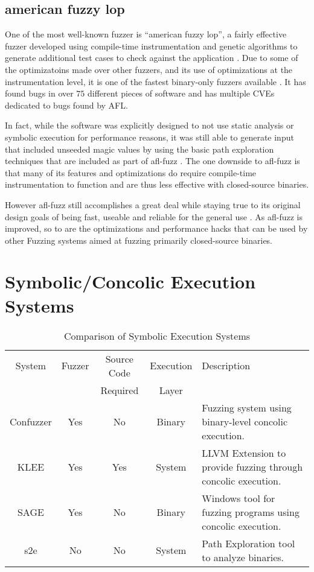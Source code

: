 \subsection{american fuzzy lop}
One of the most well-known fuzzer is ``american fuzzy lop'', a fairly effective
fuzzer developed using compile-time instrumentation and genetic algorithms to
generate additional test cases to check against the application \cite{afl}. Due
to some of the optimizatoins made over other fuzzers, and its use of
optimizations at the instrumentation level, it is one of the fastest binary-only
fuzzers available \cite{afldesign}. It has found bugs in over $75$ different
pieces of software and has multiple CVEs dedicated to bugs found by AFL.

In fact, while the software was explicitly designed to not use static analysis
or symbolic execution for performance reasons, it was still able to generate
input that included unseeded magic values by using the basic path exploration
techniques that are included as part of afl-fuzz \cite{aflsymbol}. The one
downside to afl-fuzz is that many of its features and optimizations do require
compile-time instrumentation to function and are thus less effective with
closed-source binaries.

However afl-fuzz still accomplishes a great deal while staying true to its
original design goals of being fast, useable and reliable for the general use
\cite{aflhistory}. As afl-fuzz is improved, so to are the optimizations and
performance hacks that can be used by other Fuzzing systems aimed at fuzzing
primarily closed-source binaries.

\section{Symbolic/Concolic Execution Systems}
\begin{table}
\begin{tabular}{| c | c | c | c | p{6cm} |}
\hline
System & Fuzzer & Source Code & Execution & Description\\
& & Required & Layer &\\\hline
Confuzzer & Yes & No & Binary & Fuzzing system using binary-level concolic execution.\\
KLEE & Yes & Yes & System & LLVM Extension to provide fuzzing through concolic
execution.\\
SAGE & Yes & No & Binary & Windows tool for fuzzing programs using concolic
execution.\\
s2e & No & No & System & Path Exploration tool to analyze binaries.\\
\hline
\end{tabular}
\caption{Comparison of Symbolic Execution Systems}
\label{table:othersys}
\end{table}

